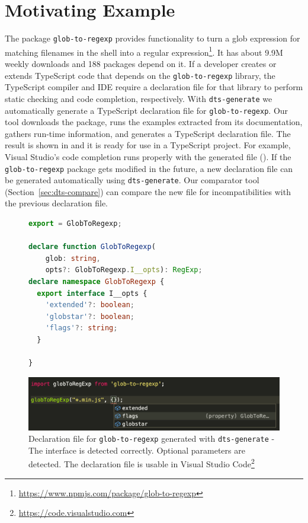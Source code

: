 \documentclass[sigconf]{acmart}
\begin{document}
\section{Motivating Example}
\label{sec:motivating-example}
The \NPM{} package \texttt{glob-to-regexp} provides functionality to turn a
glob expression for matching filenames in the shell into a regular
expression\footnote{\url{https://www.npmjs.com/package/glob-to-regexp}}. It 
has about 9.9M weekly downloads and 188 \NPM{} packages depend on it. If
a developer creates or extends TypeScript code that depends on the
\texttt{glob-to-regexp} library, the TypeScript
compiler and IDE require a declaration file for that library to
perform static checking and code completion, respectively. With
\texttt{dts-generate} we automatically generate a TypeScript
declaration file for \texttt{glob-to-regexp}. Our tool downloads the \NPM{} 
package, runs the examples extracted from its documentation, gathers
run-time information, and generates a TypeScript declaration
file. The result is 
shown in  and it is
ready for use in a TypeScript project. For example,  Visual Studio's
code completion runs properly with the generated file
(). If the
\texttt{glob-to-regexp} package gets modified in the future, a new declaration
file can be generated automatically using
\texttt{dts-generate}. Our comparator tool (Section~\ref{sec:dts-compare}) can compare the new file
for incompatibilities with the previous declaration file.

\begin{figure}[tp]
  \centering
    \begin{lstlisting}[language=TypeScript,numbers=none]
export = GlobToRegexp;

declare function GlobToRegexp(
    glob: string, 
    opts?: GlobToRegexp.I__opts): RegExp;
declare namespace GlobToRegexp {
  export interface I__opts {
    'extended'?: boolean;
    'globstar'?: boolean;
    'flags'?: string;
  }

}
    \end{lstlisting}
  \begin{center}
    \includegraphics[width=\linewidth]{motivating-example-glob-to-regexp-vscode.png}
  \end{center}

  \caption{Declaration file for \texttt{glob-to-regexp} 
    generated with \texttt{dts-generate} - The interface is
    detected correctly. Optional parameters are detected. The declaration 
    file is usable in Visual Studio Code\protect\footnote{\url{https://code.visualstudio.com}}} 
  \label{fig:motivating-example-glob-to-regexp-vscode}
\end{figure}
\end{document}
